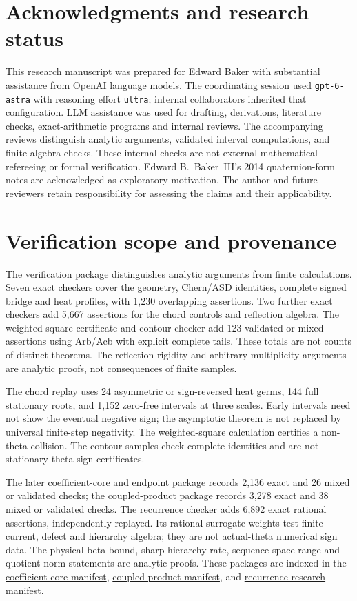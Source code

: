 \documentclass[11pt]{article}
\numberwithin{equation}{section}
\theoremstyle{definition}
\theoremstyle{remark}
\newcommand{\researchnote}[2]{\href{../../papers/investigations-2/active/22_theta_manifold_geometry/#1}{#2}}
\begin{document}
\section*{Acknowledgments and research status}
This research manuscript was prepared for Edward Baker with
substantial assistance from OpenAI language models.  The coordinating
session used \texttt{gpt-6-astra} with reasoning effort \texttt{ultra};
internal collaborators inherited that configuration.  LLM assistance
was used for drafting, derivations, literature checks, exact-arithmetic
programs and internal reviews.  The accompanying reviews distinguish analytic arguments, validated
interval computations, and finite algebra checks.  These internal checks
are not external mathematical refereeing or formal verification.
Edward B.~Baker~III's 2014 quaternion-form notes are acknowledged as
exploratory motivation.  The author and future reviewers retain
responsibility for assessing the claims and their applicability.

\appendix
\section{Verification scope and provenance}\label{app:verification}
The verification package distinguishes analytic arguments from finite
calculations. Seven exact checkers cover the geometry, Chern/ASD
identities, complete signed bridge and heat profiles, with 1,230
overlapping assertions. Two further exact checkers add 5,667 assertions
for the chord controls and reflection algebra. The weighted-square
certificate and contour checker add 123 validated or mixed assertions
using Arb/Acb with explicit complete tails. These totals are not counts
of distinct theorems. The reflection-rigidity and arbitrary-multiplicity
arguments are analytic proofs, not consequences of finite samples.

The chord replay uses 24 asymmetric or sign-reversed heat germs,
144 full stationary roots, and 1,152 zero-free intervals at three
scales. Early intervals need not show the eventual negative sign;
the asymptotic theorem is not replaced by universal finite-step
negativity. The weighted-square calculation certifies a non-theta
collision. The contour samples check complete identities and are not
stationary theta sign certificates.

The later coefficient-core and endpoint package records 2,136 exact
and 26 mixed or validated checks; the coupled-product package records
3,278 exact and 38 mixed or validated checks. The recurrence checker
adds 6,892 exact rational assertions, independently replayed. Its rational
surrogate weights test finite current, defect and hierarchy algebra;
they are not actual-theta numerical sign data. The physical beta bound,
sharp hierarchy rate, sequence-space range and quotient-norm statements
are analytic proofs. These packages are indexed in the
\researchnote{numerics/COEFFICIENT_CORE_AND_TWO_ENDPOINT_CHECKS_20261015.json}
{coefficient-core manifest},
\researchnote{numerics/COUPLED_PRODUCT_CONTINUATION_CHECKS_20261015.json}
{coupled-product manifest}, and
\researchnote{numerics/ADJOINT_RECURRENCE_CONTINUATION_CHECKS_20261015.json}
{recurrence research manifest}.
\end{document}
